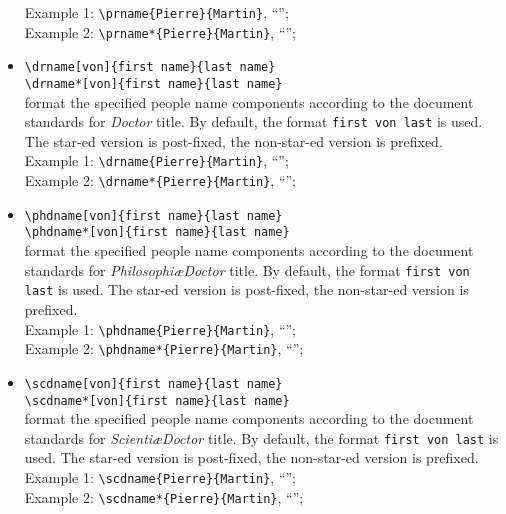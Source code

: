 \documentclass[book]{upmethodology-document}
\begin{document}
\begin{itemize}
	Example 1: \texttt{{\textbackslash}prname\{Pierre\}\{Martin\}}, ``''; \\
	Example 2: \texttt{{\textbackslash}prname*\{Pierre\}\{Martin\}}, ``'';
\item \texttt{{\textbackslash}drname[von]\{first name\}\{last name\}} \\
      \texttt{{\textbackslash}drname*[von]\{first name\}\{last name\}} \\
	format the specified people name components according to the document standards for \emph{Doctor} title. By default, the format \texttt{first von last} is used. The star-ed version is post-fixed, the non-star-ed version is prefixed. \\
	Example 1: \texttt{{\textbackslash}drname\{Pierre\}\{Martin\}}, ``''; \\
	Example 2: \texttt{{\textbackslash}drname*\{Pierre\}\{Martin\}}, ``'';
\item \texttt{{\textbackslash}phdname[von]\{first name\}\{last name\}} \\
      \texttt{{\textbackslash}phdname*[von]\{first name\}\{last name\}} \\
	format the specified people name components according to the document standards for \emph{Philosophi\ae Doctor} title. By default, the format \texttt{first von last} is used. The star-ed version is post-fixed, the non-star-ed version is prefixed. \\
	Example 1: \texttt{{\textbackslash}phdname\{Pierre\}\{Martin\}}, ``''; \\
	Example 2: \texttt{{\textbackslash}phdname*\{Pierre\}\{Martin\}}, ``'';
\item \texttt{{\textbackslash}scdname[von]\{first name\}\{last name\}} \\
      \texttt{{\textbackslash}scdname*[von]\{first name\}\{last name\}} \\
	format the specified people name components according to the document standards for \emph{Scienti\ae Doctor} title. By default, the format \texttt{first von last} is used. The star-ed version is post-fixed, the non-star-ed version is prefixed. \\
	Example 1: \texttt{{\textbackslash}scdname\{Pierre\}\{Martin\}}, ``''; \\
	Example 2: \texttt{{\textbackslash}scdname*\{Pierre\}\{Martin\}}, ``'';

\end{itemize}
\end{document}

